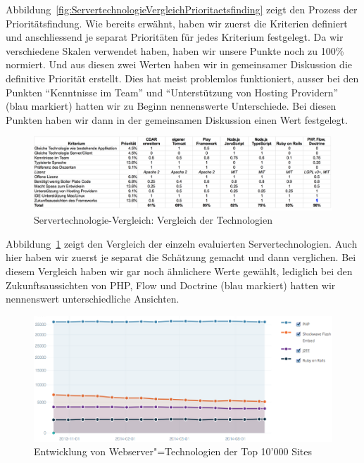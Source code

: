 			Abbildung~\ref{fig:ServertechnologieVergleichPrioritaetsfinding} zeigt den Prozess der Prioritätsfindung.
			Wie bereits erwähnt, haben wir zuerst die Kriterien definiert und 
			anschliessend je separat Prioritäten für jedes Kriterium festgelegt.
			Da wir verschiedene Skalen verwendet haben, haben wir unsere Punkte noch zu 100\% normiert.
			Und aus diesen zwei Werten haben wir in gemeinsamer Diskussion die definitive Priorität erstellt.
			Dies hat meist problemlos funktioniert, ausser bei den Punkten "`Kenntnisse im Team"' und "`Unterstützung von Hosting Providern"' (blau markiert) hatten wir zu Beginn nennenswerte Unterschiede.
			Bei diesen Punkten haben wir dann in der gemeinsamen Diskussion einen Wert festgelegt.
		
			\begin{figure}[H]
				\begin{minipage}[b]{\linewidth}
					\includegraphics[width=\textwidth]{media/spreadsheets/ServertechnologieVergleichVergleichDerTechnologien.pdf}
					\centering
					\caption{Servertechnologie-Vergleich: Vergleich der Technologien}
					\label{fig:ServertechnologieVergleichVergleichDerTechnologien.pdf}
				\end{minipage}
			\end{figure}
			
			Abbildung~\ref{fig:ServertechnologieVergleichVergleichDerTechnologien.pdf} zeigt den Vergleich der einzeln evaluierten Servertechnologien.
			Auch hier haben wir zuerst je separat die Schätzung gemacht und dann verglichen.
			Bei diesem Vergleich haben wir gar noch ähnlichere Werte gewählt, lediglich bei den Zukunftsaussichten von PHP, Flow und Doctrine (blau markiert) hatten wir nennenswert unterschiedliche Ansichten.
			
			\begin{figure}
					\includegraphics[width=\textwidth]{media/img/EntwicklungVonWebserverTechnologien.png}
					\centering
					\caption{Entwicklung von Webserver"=Technologien der Top 10'000 Sites \cite{builtwith_pty_ltd_framework_2014}}
					\label{fig:EntwicklungVonWebserverTechnologien}
			\end{figure}
			
